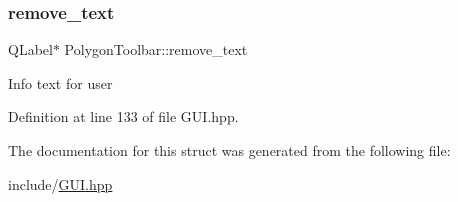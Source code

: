\subsubsection{\texorpdfstring{remove\+\_\+text}{remove\_text}}
{\footnotesize\ttfamily Q\+Label$\ast$ Polygon\+Toolbar\+::remove\+\_\+text}

Info text for user 

Definition at line 133 of file G\+U\+I.\+hpp.



The documentation for this struct was generated from the following file\+:\begin{DoxyCompactItemize}
\item 
include/\mbox{\hyperlink{GUI_8hpp}{G\+U\+I.\+hpp}}\end{DoxyCompactItemize}
